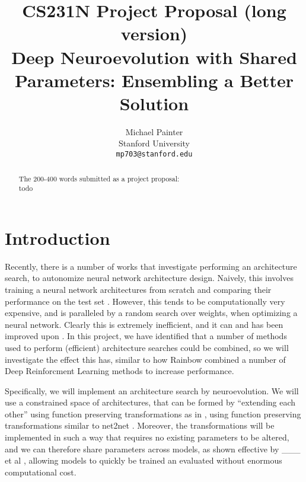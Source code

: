 \documentclass[10pt,twocolumn,letterpaper]{article}
\begin{document}
\title{CS231N Project Proposal (long version)\\ Deep Neuroevolution with Shared Parameters: Ensembling a Better Solution}

\author{Michael Painter\\
Stanford University\\
{\tt\small mp703@stanford.edu}
}

\maketitle
\begin{abstract}
   The 200-400 words submitted as a project proposal: \\
   todo
\end{abstract}

\newcommand{\cH}{\mathcal{H}}
\newcommand{\cX}{\mathcal{X}}
\newcommand{\cY}{\mathcal{Y}}

\section{Introduction}
Recently, there is a number of works that investigate performing an architecture search, to autonomize neural network architecture design. Naively, this involves training a neural network architectures from scratch and comparing their performance on the test set \cite{as1, as2}. However, this tends to be computationally very expensive, and is paralleled by a random search over weights, when optimizing a neural network. Clearly this is extremely inefficient, and it can and has been improved upon \cite{eas1, eas2}. In this project, we have identified that a number of methods used to perform (efficient) architecture searches could be combined, so we will investigate the effect this has, similar to how Rainbow \cite{rainbow} combined a number of Deep Reinforcment Learning methods to increase performance.

Specifically, we will implement an architecture search by neuroevolution. We will use a constrained space of architectures, that can be formed by ``extending each other'' using function preserving transformations as in \cite{eas1}, using function preserving transformations similar to net2net \cite{net2net}. Moreover, the transformations will be implemented in such a way that requires no existing parameters to be altered, and we can therefore share parameters across models, as shown effective by \_\_\_ et al \cite{eas2}, allowing models to quickly be trained an evaluated without enormous computational cost.
\end{document}

